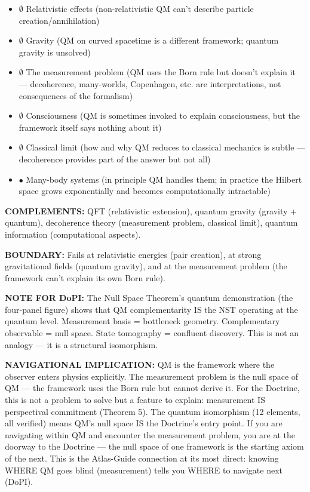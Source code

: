 \begin{itemize}[nosep,leftmargin=*]
  \item $\emptyset$ Relativistic effects (non-relativistic QM can't describe particle creation/annihilation)
  \item $\emptyset$ Gravity (QM on curved spacetime is a different framework; quantum gravity is unsolved)
  \item $\emptyset$ The measurement problem (QM uses the Born rule but doesn't explain it — decoherence, many-worlds, Copenhagen, etc. are interpretations, not consequences of the formalism)
  \item $\emptyset$ Consciousness (QM is sometimes invoked to explain consciousness, but the framework itself says nothing about it)
  \item $\emptyset$ Classical limit (how and why QM reduces to classical mechanics is subtle — decoherence provides part of the answer but not all)
  \item $\bullet$ Many-body systems (in principle QM handles them; in practice the Hilbert space grows exponentially and becomes computationally intractable)
\end{itemize}


\textbf{COMPLEMENTS:} QFT (relativistic extension), quantum gravity (gravity + quantum), decoherence theory (measurement problem, classical limit), quantum information (computational aspects).


\textbf{BOUNDARY:} Fails at relativistic energies (pair creation), at strong gravitational fields (quantum gravity), and at the measurement problem (the framework can't explain its own Born rule).


\textbf{NOTE FOR DoPI:} The Null Space Theorem's quantum demonstration (the four-panel figure) shows that QM complementarity IS the NST operating at the quantum level. Measurement basis = bottleneck geometry. Complementary observable = null space. State tomography = confluent discovery. This is not an analogy — it is a structural isomorphism.


\textbf{NAVIGATIONAL IMPLICATION:} QM is the framework where the observer enters physics explicitly. The measurement problem is the null space of QM — the framework uses the Born rule but cannot derive it. For the Doctrine, this is not a problem to solve but a feature to explain: measurement IS perspectival commitment (Theorem 5). The quantum isomorphism (12 elements, all verified) means QM's null space IS the Doctrine's entry point. If you are navigating within QM and encounter the measurement problem, you are at the doorway to the Doctrine — the null space of one framework is the starting axiom of the next. This is the Atlas-Guide connection at its most direct: knowing WHERE QM goes blind (measurement) tells you WHERE to navigate next (DoPI).



